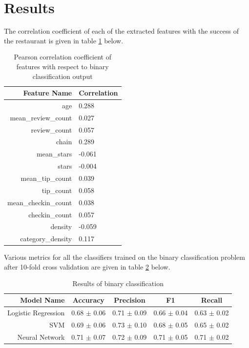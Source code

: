 \documentclass[12pt]{article}
\begin{document}
  \section{Results}

  The correlation coefficient of each of the extracted features with the success of the restaurant is given in table \ref{tab:correlation} below.

  \begin{table}[H]
    \centering
    \caption{Pearson correlation coefficient of features with respect to binary classification output}
    \label{tab:correlation}
    \begin{tabular}{r|l}
      \textbf{Feature Name} & \textbf{Correlation} \\
      \hline
      age & 0.288 \\
      mean\_review\_count & 0.027 \\
      review\_count & 0.057 \\
      chain & 0.289 \\
      mean\_stars & -0.061 \\
      stars & -0.004 \\
      mean\_tip\_count & 0.039 \\
      tip\_count & 0.058 \\
      mean\_checkin\_count & 0.038 \\
      checkin\_count & 0.057 \\
      density & -0.059 \\
      category\_density & 0.117
    \end{tabular}
  \end{table}

  Various metrics for all the classifiers trained on the binary classification problem after 10-fold cross validation are given in table \ref{tab:binary} below.\\

  \begin{table}[H]
    \centering
    \caption{Results of binary classification}
    \label{tab:binary}
    \begin{tabular}{r||c|c|c|c}
      \textbf{Model Name} & \textbf{Accuracy} & \textbf{Precision} & \textbf{F1} & \textbf{Recall}\\
      \hline
      Logistic Regression & 0.68 $\pm$ 0.06 & 0.71 $\pm$ 0.09 & 0.66 $\pm$ 0.04 & 0.63 $\pm$ 0.02 \\
      SVM & 0.69 $\pm$ 0.06 & 0.73 $\pm$ 0.10 & 0.68 $\pm$ 0.05 & 0.65 $\pm$ 0.02 \\
      Neural Network & 0.71 $\pm$ 0.07 & 0.72 $\pm$ 0.09 & 0.71 $\pm$ 0.05 & 0.71 $\pm$ 0.02
    \end{tabular}
  \end{table}
\end{document}
